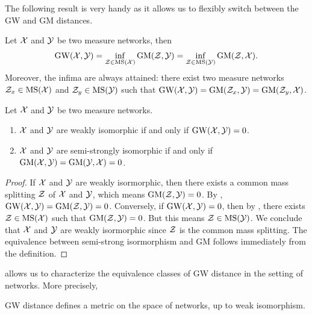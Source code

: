 The following result is very handy as it allows us to flexibly switch between the GW and GM distances.
\begin{corollary}
  \label{GW_mGW}
  Let $\mathcal X$ and $\mathcal Y$ be two measure networks, then
  \begin{align}
    \text{GW}(\mathcal X, \mathcal Y) = \inf_{\mathcal Z \in \text{MS}(\mathcal X)} \text{GM}(\mathcal Z, \mathcal Y)
    = \inf_{\mathcal Z \in \text{MS}(\mathcal Y)} \text{GM}(\mathcal Z, \mathcal X).
  \end{align}
  Moreover, the infima are always attained: there exist two measure networks $\mathcal Z_x \in \text{MS}(\mathcal X)$ and
  $\mathcal Z_y \in \text{MS}(\mathcal Y)$ such that
  $\text{GW}(\mathcal X, \mathcal Y) = \text{GM}(\mathcal Z_x, \mathcal Y) = \text{GM}(\mathcal Z_y, \mathcal X)$.
\end{corollary}
\begin{proposition} \label{prop:GW_iso}
  Let $\mathcal X$ and $\mathcal Y$ be two measure networks.
  \begin{enumerate}
    \item $\mathcal X$ and $\mathcal Y$ are weakly isomorphic if and only if $\text{GW}(\mathcal X, \mathcal Y) = 0$.
    \item $\mathcal X$ and $\mathcal Y$ are semi-strongly isomorphic if and only if
    $\text{GM}(\mathcal X, \mathcal Y) = \text{GM}(\mathcal Y, \mathcal X) = 0$.
  \end{enumerate}
\end{proposition}
\begin{proof}
If $\mathcal X$ and $\mathcal Y$ are weakly isormorphic, then there exists a common mass splitting
$\mathcal Z$ of $\mathcal X$ and $\mathcal Y$, which means $\text{GM}(\mathcal Z, \mathcal Y) = 0$. By ,
$\text{GW}(\mathcal X, \mathcal Y) = \text{GM}(\mathcal Z, \mathcal Y) = 0$. Conversely, if $\text{GW}(\mathcal X, \mathcal Y) = 0$,
then by , there exists $\mathcal Z \in \text{MS}(\mathcal X)$ such that $\text{GM}(\mathcal Z, \mathcal Y) = 0$.
But this means $\mathcal Z \in \text{MS}(\mathcal Y)$. We conclude that $\mathcal X$ and $\mathcal Y$ are weakly isormorphic
since $\mathcal Z$ is the common mass splitting. The equivalence between semi-strong isormorphism and
GM follows immediately from the definition.
\end{proof}
 allows us to characterize the equivalence classes of GW distance in the
setting of networks. More precisely,
\begin{proposition}
  GW distance defines a metric on the space of networks, up to weak isomorphism.
\end{proposition}
